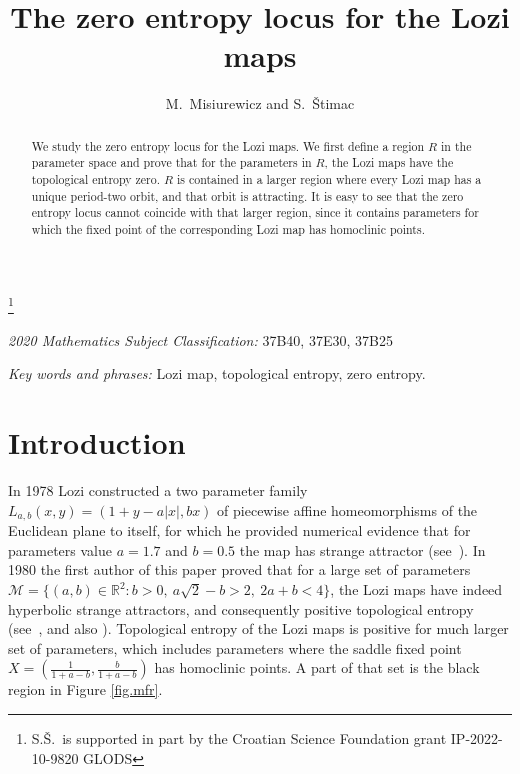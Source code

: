 \documentclass[12pt]{amsart}
\theoremstyle{plain}
\theoremstyle{definition}
\def\R{{\mathbb R}}
\begin{document}
	
	\title{The zero entropy locus for the Lozi maps}
	\author{M.\ Misiurewicz and 
		S.\ \v{S}timac}
	\thanks{S.\v S.\ is supported in part by the Croatian Science 
		Foundation grant IP-2022-10-9820 GLODS}
	
	\renewcommand\footnotemark{}
	
	\date{}
	
	\maketitle
	
	\begin{abstract}
		We study the zero entropy locus for the Lozi maps.
		We first define a region $R$ in the parameter space and
		prove that for the parameters in $R$, the Lozi maps have
		the topological entropy zero. $R$ is contained in a larger 
		region where every Lozi map has a unique period-two orbit, 
		and that orbit is attracting. It is easy to see that the
		zero entropy locus cannot coincide with that larger region,
		since it contains parameters for which the fixed point of 
		the corresponding Lozi map has homoclinic points.
		
	\end{abstract}
	
	
	{\it 2020 Mathematics Subject Classification:} 37B40, 37E30, 37B25
	
	{\it Key words and phrases:} Lozi map, topological entropy, zero entropy.		
	
	\baselineskip=18pt
	
	\section{Introduction}\label{sec:intro}
	
	In 1978 Lozi constructed a two parameter family
	$L_{a,b}(x,y)=(1+y-a|x|,bx)$ of piecewise affine homeomorphisms of the
	Euclidean plane to itself, for which he provided numerical evidence
	that for parameters value $a = 1.7$ and $b = 0.5$ the map has strange
	attractor (see~\cite{L}). In 1980 the first author of this paper proved 
	that for a large set of parameters 
	$\mathcal{M} = \{ (a,b) \in \R^2 : b > 0, \ a\sqrt{2} - b > 2, \ 2a + b < 4 \}$, 
	the Lozi maps have indeed hyperbolic strange attractors, and consequently
	positive topological entropy (see~\cite{M}, and also \cite{MS2}). Topological
	entropy of the Lozi maps is positive for much larger set of parameters, which
	includes parameters where the saddle fixed point 
	$X = (\frac{1}{1+a-b}, \frac{b}{1+a-b})$ has homoclinic points. A part of
	that set is the black region in Figure \ref{fig.mfr}.
	
\end{document}
